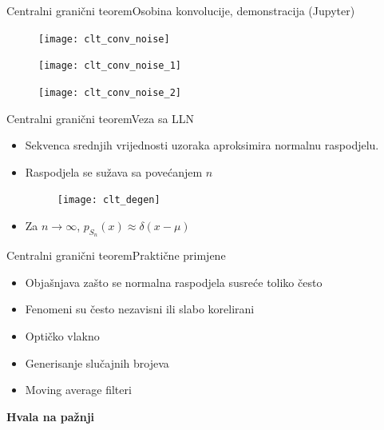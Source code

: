 \documentclass[aspectratio=169]{beamer}
\begin{document}
  \begin{frame}{Centralni granični teorem}{Osobina konvolucije, demonstracija
    (Jupyter)}
    \begin{figure}
      \begin{minipage}[b]{0.27\linewidth}
        \centering
        \texttt{[image: clt\_conv\_noise]}
      \end{minipage}
      \hspace{0.5cm}
      \begin{minipage}[b]{0.27\linewidth}
        \centering
        \texttt{[image: clt\_conv\_noise\_1]}
      \end{minipage}
      \hspace{0.5cm}
      \begin{minipage}[b]{0.27\linewidth}
        \centering
        \texttt{[image: clt\_conv\_noise\_2]}
      \end{minipage}
    \end{figure}
  \end{frame}

  \begin{frame}{Centralni granični teorem}{Veza sa LLN}
    \begin{itemize}
      \item Sekvenca srednjih vrijednosti uzoraka aproksimira normalnu raspodjelu.
      \item Raspodjela se sužava sa povećanjem $n$
        \begin{figure}
          \centering
          \texttt{[image: clt\_degen]}
        \end{figure}
      \item Za $n\to\infty$, $p_{S_n}(x) \approx \delta(x-\mu)$
    \end{itemize}
  \end{frame}

  \begin{frame}{Centralni granični teorem}{Praktične primjene}
    \begin{itemize}
      \item Objašnjava zašto se normalna raspodjela susreće toliko često
      \item Fenomeni su često nezavisni ili slabo korelirani
      \item Optičko vlakno
      \item Generisanje slučajnih brojeva
      \item Moving average filteri
    \end{itemize}
  \end{frame}

  \begin{frame}
    \textbf{\Huge Hvala na pažnji}
  \end{frame}
  
\end{document}
